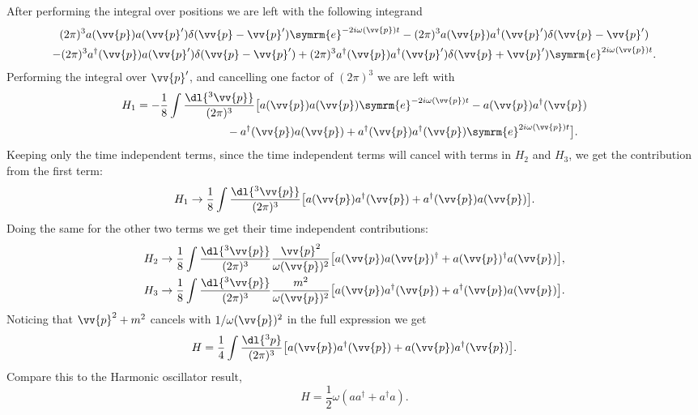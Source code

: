 \documentclass[fleqn]{NotesClass}
\newcommand{\e}{\symrm{e}}
\newcommand{\hermit}{{\dagger}}
\begin{document}
    After performing the integral over positions we are left with the following integrand
    \begin{multline*}
        (2\pi)^3 a(\vv{p}) a(\vv{p}') \delta(\vv{p} - \vv{p}')\e^{-2i\omega(\vv{p})t} - (2\pi)^3 a(\vv{p}) a^\hermit(\vv{p}') \delta(\vv{p} - \vv{p}')\\
        - (2\pi)^3a^\hermit(\vv{p})a(\vv{p}')\delta(\vv{p} - \vv{p}') + (2\pi)^3a^\hermit(\vv{p}) a^\hermit(\vv{p}') \delta(\vv{p} + \vv{p}') \e^{2i\omega(\vv{p})t}.
    \end{multline*}
    Performing the integral over \(\vv{p}'\), and cancelling one factor of \((2\pi)^3\) we are left with
    \begin{align}
        H_1 &= -\frac{1}{8} \int \frac{\dl{^3\vv{p}}}{(2\pi)^3} \big[ a(\vv{p}) a(\vv{p}) \e^{-2i\omega(\vv{p})t}  - a(\vv{p}) a^\hermit(\vv{p})\\
        &\qquad\qquad\qquad\qquad- a^\hermit(\vv{p}) a(\vv{p}) + a^\hermit(\vv{p})a^\hermit(\vv{p}) \e^{2i\omega(\vv{p})t} \big].\notag
    \end{align}
    Keeping only the time independent terms, since the time independent terms will cancel with terms in \(H_2\) and \(H_3\), we get the contribution from the first term:
    \begin{equation}
        H_1 \to \frac{1}{8} \int \frac{\dl{^3\vv{p}}}{(2\pi)^3} \big[ a(\vv{p}) a^\hermit(\vv{p})+ a^\hermit(\vv{p}) a(\vv{p}) \big].
    \end{equation}
    Doing the same for the other two terms we get their time independent contributions:
    \begin{align}
        H_2 &\to \frac{1}{8} \int \frac{\dl{^3\vv{p}}}{(2\pi)^3} \frac{\vv{p}^2}{\omega(\vv{p})^2} \big[ a(\vv{p}) a(\vv{p})^\hermit + a(\vv{p})^\hermit a(\vv{p}) \big],\\
        H_3 &\to \frac{1}{8} \int \frac{\dl{^3\vv{p}}}{(2\pi)^3} \frac{m^2}{\omega(\vv{p})^2} \big[ a(\vv{p}) a^\hermit(\vv{p}) + a^\hermit(\vv{p}) a(\vv{p}) \big].
    \end{align}
    Noticing that \(\vv{p}^2 + m^2\) cancels with \(1/\omega(\vv{p})^2\) in the full expression we get
    \begin{equation}
        H = \frac{1}{4} \int \frac{\dl{^3p}}{(2\pi)^3} \big[ a(\vv{p})a^\hermit(\vv{p}) + a(\vv{p})a^\hermit(\vv{p}) \big].
    \end{equation}
    Compare this to the Harmonic oscillator result,
    \begin{equation}
        H = \frac{1}{2}\omega(aa^\hermit + a^\hermit a).
    \end{equation}
    
\end{document}
